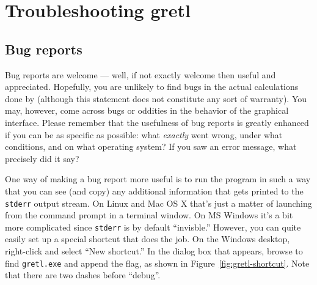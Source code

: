 \chapter{Troubleshooting gretl}
\label{trouble}

\section{Bug reports}
\label{trouble-bugs}

Bug reports are welcome --- well, if not exactly welcome then useful
and appreciated. Hopefully, you are unlikely to find bugs in the
actual calculations done by  (although this statement does
not constitute any sort of warranty). You may, however, come across
bugs or oddities in the behavior of the graphical interface.  Please
remember that the usefulness of bug reports is greatly enhanced if you
can be as specific as possible: what \emph{exactly} went wrong, under
what conditions, and on what operating system?  If you saw an error
message, what precisely did it say?

One way of making a bug report more useful is to run the program in
such a way that you can see (and copy) any additional information that
gets printed to the \texttt{stderr} output stream. On Linux and Mac
OS X that's just a matter of launching  from the command
prompt in a terminal window. On MS Windows it's a bit more complicated
since \texttt{stderr} is by default ``invisble.'' However, you can
quite easily set up a special  shortcut that does the job.
On the Windows desktop, right-click and select ``New shortcut.'' In the
dialog box that appears, browse to find \texttt{gretl.exe} and
append the  flag, as shown in
Figure~\ref{fig:gretl-shortcut}.  Note that there are two dashes
before ``debug''.

